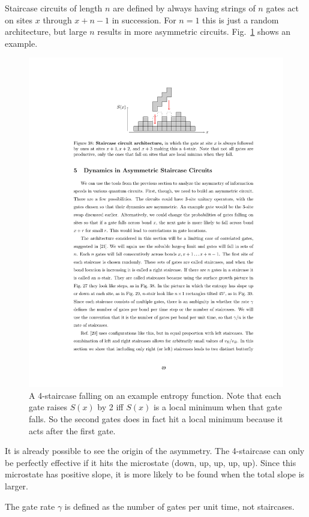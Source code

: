 \documentclass[aps,prx,reprint,superscriptaddress, longbibliography]{revtex4-1}
\begin{document}
Staircase circuits of length $n$ are defined by always having strings of $n$ gates act on sites $x$ through $x+n-1$ in succession. For $n=1$ this is just a random architecture, but large $n$ results in more asymmetric circuits. Fig.~\ref{fig:stairs} shows an example.
\begin{figure}
	\includegraphics[width=\columnwidth]{stairs}
	\caption{A 4-staircase falling on an example entropy function. Note that each gate raises $S(x)$ by 2 iff $S(x)$ is a local minimum when that gate falls. So the second gates does in fact hit a local minimum because it acts after the first gate.}
	\label{fig:stairs}
\end{figure}
It is already possible to see the origin of the asymmetry. The 4-staircase can only be perfectly effective if it hits the microstate (down, up, up, up, up). Since this microstate has positive slope, it is more likely to be found when the total slope is larger.

The gate rate $\gamma$ is defined as the number of gates per unit time, not staircases.
\end{document}
